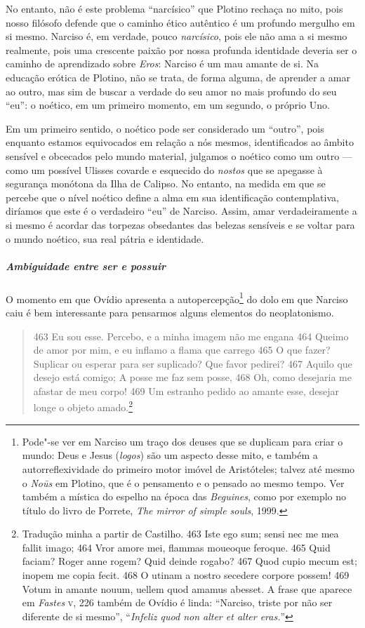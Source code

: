 No entanto, não é este problema “narcísico” que Plotino rechaça no
mito, pois nosso filósofo defende que o caminho ético autêntico é um
profundo mergulho em si mesmo. Narciso é, em verdade, pouco
\emph{narcísico}, pois ele não ama a si mesmo realmente, pois uma
crescente paixão por nossa profunda identidade deveria ser o caminho
de aprendizado sobre \emph{Eros}: Narciso é um mau amante de si. Na
educação erótica de Plotino, não se trata, de forma alguma, de
aprender a amar ao outro, mas sim de buscar a verdade do seu amor no
mais profundo do seu “eu”: o noético, em um primeiro momento, em um
segundo, o próprio Uno. 

Em um primeiro sentido, o noético pode ser considerado um “outro”,
pois enquanto estamos equivocados em relação a nós mesmos,
identificados ao âmbito sensível e obcecados pelo mundo material,
julgamos o noético como um outro --- como um possível Ulisses covarde e
esquecido do \emph{nostos} que se apegasse à segurança monótona da
Ilha de Calipso. No entanto, na medida em que se percebe que o nível
noético define a alma em sua identificação contemplativa, diríamos
que este é o verdadeiro “eu” de Narciso. Assim, amar verdadeiramente
a si mesmo é acordar das torpezas obsedantes das belezas sensíveis e
se voltar para o mundo noético, sua real pátria e identidade.

\subparagraph{Ambiguidade entre ser e possuir}

O momento em que Ovídio apresenta a autopercepção\footnote{ Pode"-se
ver em Narciso um traço dos deuses que se duplicam para criar o
mundo: Deus e Jesus (\emph{logos}) são um aspecto desse mito, e
também a autorreflexividade do primeiro motor imóvel de Aristóteles;
talvez até mesmo o \emph{Noūs} em Plotino, que é o pensamento e o
pensado ao mesmo tempo. Ver também a mística do espelho na época das
\emph{Beguines}, como por exemplo no título do livro de
Porrete,\emph{ The mirror of simple souls}, 1999.} do dolo em que
Narciso caiu é bem interessante para pensarmos alguns elementos do
neoplatonismo.

\begin{quote}
463 Eu sou esse. Percebo, e a minha imagem não me engana 464
Queimo de amor por mim, e eu inflamo a flama que carrego 465 O que
fazer? Suplicar ou esperar para ser suplicado? Que favor pedirei? 467
Aquilo que desejo está comigo; A posse me faz sem posse, 468 Oh, como
desejaria me afastar de meu corpo! 469 Um estranho pedido ao amante
esse, desejar longe o objeto amado.\footnote{ Tradução minha a partir de Castilho. 463 Iste ego sum;
sensi nec me mea fallit imago; 464 Vror amore mei, flammas moueoque
feroque. 465 Quid faciam? Roger anne rogem? Quid deinde rogabo? 467
Quod cupio mecum est; inopem me copia fecit. 468 O utinam a nostro
secedere corpore possem! 469 Votum in amante nouum, uellem quod
amamus abesset. A frase que aparece em \emph{Fastes} \textsc{v}, 226 também
de Ovídio é linda: “Narciso, triste por não ser diferente de si
mesmo”, “\emph{Infeliz quod non alter et alter eras.}”}
\end{quote}


